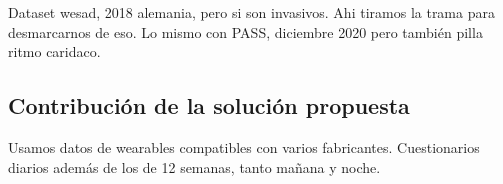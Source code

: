 Dataset wesad, 2018 alemania, pero si son invasivos. Ahi tiramos la trama para desmarcarnos de eso. Lo mismo con PASS, diciembre 2020 pero también pilla ritmo caridaco.

\subsection{Contribución de la solución propuesta}

Usamos datos de wearables compatibles con varios fabricantes.
Cuestionarios diarios además de los de 12 semanas, tanto mañana y noche.